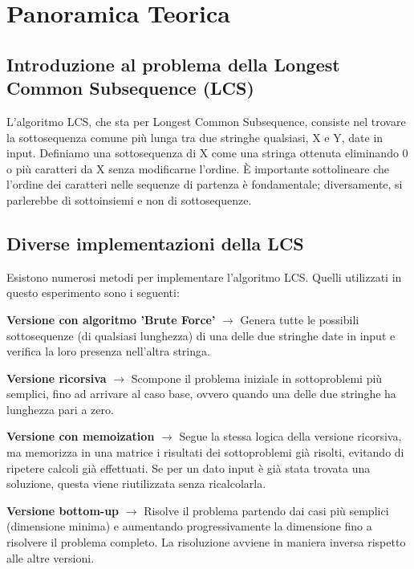 \section{Panoramica Teorica}

	\subsection{Introduzione al problema della Longest Common Subsequence (LCS)}
L'algoritmo LCS, che sta per Longest Common Subsequence, consiste nel trovare la sottosequenza comune più lunga tra due stringhe qualsiasi, X e Y, date in input. Definiamo una sottosequenza di X come una stringa ottenuta eliminando 0 o più caratteri da X senza modificarne l'ordine. È importante sottolineare che l'ordine dei caratteri nelle sequenze di partenza è fondamentale; diversamente, si parlerebbe di sottoinsiemi e non di sottosequenze.
	
	\subsection{Diverse implementazioni della LCS}
Esistono numerosi metodi per implementare l'algoritmo LCS. Quelli utilizzati in questo esperimento sono i seguenti:
		
		\begin{DESC}{1}
			\item[\textbf{Versione con algoritmo 'Brute Force'}] $\rightarrow$ Genera tutte le possibili sottosequenze (di qualsiasi lunghezza) di una delle due stringhe date in input e verifica la loro presenza nell'altra stringa.
			\item[\textbf{Versione ricorsiva}] $\rightarrow$ Scompone il problema iniziale in sottoproblemi più semplici, fino ad arrivare al caso base, ovvero quando una delle due stringhe ha lunghezza pari a zero.
			\item[\textbf{Versione con memoization}] $\rightarrow$ Segue la stessa logica della versione ricorsiva, ma memorizza in una matrice i risultati dei sottoproblemi già risolti, evitando di ripetere calcoli già effettuati. Se per un dato input è già stata trovata una soluzione, questa viene riutilizzata senza ricalcolarla.
			\item[\textbf{Versione bottom-up}] $\rightarrow$ Risolve il problema partendo dai casi più semplici (dimensione minima) e aumentando progressivamente la dimensione fino a risolvere il problema completo. La risoluzione avviene in maniera inversa rispetto alle altre versioni.
		\end{DESC}
	
